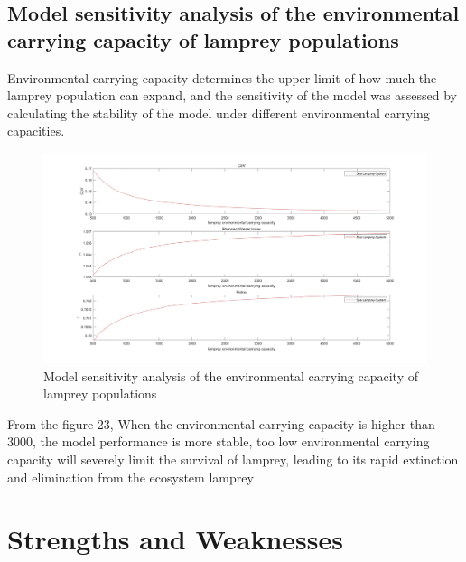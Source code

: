\documentclass[12pt]{article}  %
\begin{document}
\subsection{Model sensitivity analysis of the environmental carrying capacity of lamprey populations}
Environmental carrying capacity determines the upper limit of how much the lamprey population can expand, and the sensitivity of the model was assessed by calculating the stability of the model under different environmental carrying capacities.\par
\begin{figure}[htbp]  %
	\centering  %
	\includegraphics[width=.9\textwidth]{img/ikr.jpg} %
	\caption{Model sensitivity analysis of the environmental carrying capacity of lamprey populations} %
\end{figure}
\par
From the figure 23, When the environmental carrying capacity is higher than 3000, the model performance is more stable, too low environmental carrying capacity will severely limit the survival of lamprey, leading to its rapid extinction and elimination from the ecosystem lamprey
\section{Strengths and Weaknesses}
\end{document}
